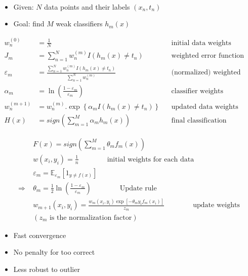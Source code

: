 \\
 \begin{itemize}
	\item Given: $N$ data points and their labels $(x_n, t_n)$
	\item Goal: find $M$ weak classifiers $h_m(x)$
\end{itemize}
\begin{align}
	w_n^{(0)} &= \frac{1}{N} && \text{initial data weights}\\
	J_m &= \sum_{n=1}^{N} w_n^{(m)} I\left( h_m(x) \neq t_n \right) && \text{weighted error function}\\
	\varepsilon_m &= \frac{\sum_{n=1}^{N} w_n^{(m)} I\left( h_m(x) \neq t_n \right) }{\sum_{n=1}^{N} w_n^{(m)}} && \text{(normalized) weighted error}\\
	\alpha_m &= \ln \left(\frac{1-\varepsilon_m}{\varepsilon_m}\right) && \text{classifier weights}\\
	w_n^{(m+1)} &= w_n^{(m)}.\exp\left\{ \alpha_m I\left( h_m(x) \neq t_n \right)\right\} && \text{updated data weights}\\
	H(x) &= sign\left( \sum_{m=1}^{M} \alpha_m h_m(x) \right) && \text{final classification}
\end{align}

\begin{align}
	&F(x) = sign \left( \sum_{m=1}^{M} \theta_m f_m(x) \right)\\
	&w(x_i, y_i) = \frac{1}{n} \qquad\qquad \text{initial weights for each data}\\
	&\varepsilon_m = \mathbb{E}_{\varepsilon_m} \left[ 1_{y \neq f(x)} \right]\\
	\Rightarrow\; &\theta_m = \frac{1}{2} \ln\left( \frac{1-\varepsilon_m}{\varepsilon_m} \right) \qquad\qquad \text{Update rule}\\
	&w_{m+1}(x_i, y_i) = \frac{w_m(x_i, y_i) \exp[-\theta_m y_i f_m(x_i)]}{z_m} \qquad\qquad \text{update weights}\\
	&(z_m \text{ is the normalization factor})
\end{align}

\begin{itemize}
	\item Fast convergence
	\item No penalty for too correct
	\item Less robust to outlier
\end{itemize}

